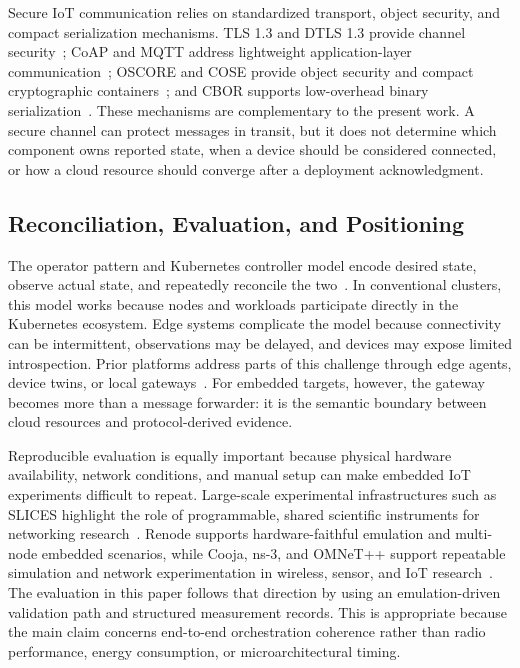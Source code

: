 Secure IoT communication relies on standardized transport, object security, and compact serialization mechanisms. TLS 1.3 and DTLS 1.3 provide channel security~\cite{rfc8446,rfc9147}; CoAP and MQTT address lightweight application-layer communication~\cite{rfc7252,mqtt}; OSCORE and COSE provide object security and compact cryptographic containers~\cite{rfc8613,rfc9052}; and CBOR supports low-overhead binary serialization~\cite{rfc8949}. These mechanisms are complementary to the present work. A secure channel can protect messages in transit, but it does not determine which component owns reported state, when a device should be considered connected, or how a cloud resource should converge after a deployment acknowledgment.

\subsection{Reconciliation, Evaluation, and Positioning}
The operator pattern and Kubernetes controller model encode desired state, observe actual state, and repeatedly reconcile the two~\cite{kubernetes,kubernetes_operators}. In conventional clusters, this model works because nodes and workloads participate directly in the Kubernetes ecosystem. Edge systems complicate the model because connectivity can be intermittent, observations may be delayed, and devices may expose limited introspection. Prior platforms address parts of this challenge through edge agents, device twins, or local gateways~\cite{kubeedge,openyurt,akri,edgex,lwm2m}. For embedded targets, however, the gateway becomes more than a message forwarder: it is the semantic boundary between cloud resources and protocol-derived evidence.

Reproducible evaluation is equally important because physical hardware availability, network conditions, and manual setup can make embedded IoT experiments difficult to repeat. Large-scale experimental infrastructures such as SLICES highlight the role of programmable, shared scientific instruments for networking research~\cite{fdida2022slices}. Renode supports hardware-faithful emulation and multi-node embedded scenarios, while Cooja, ns-3, and OMNeT++ support repeatable simulation and network experimentation in wireless, sensor, and IoT research~\cite{renode,cooja,ns3,omnet}. The evaluation in this paper follows that direction by using an emulation-driven validation path and structured measurement records. This is appropriate because the main claim concerns end-to-end orchestration coherence rather than radio performance, energy consumption, or microarchitectural timing.


